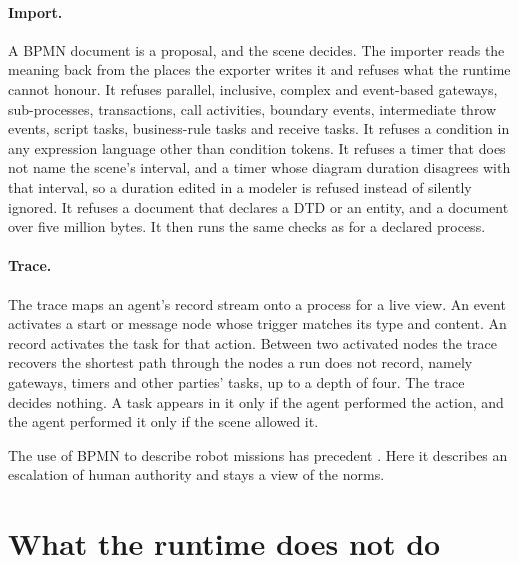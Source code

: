 \paragraph{Import.}
A BPMN document is a proposal, and the scene decides. The importer reads the meaning back from the
places the exporter writes it and refuses what the runtime cannot honour. It refuses parallel,
inclusive, complex and event-based gateways, sub-processes, transactions, call activities, boundary
events, intermediate throw events, script tasks, business-rule tasks and receive tasks. It refuses a
condition in any expression language other than condition tokens. It refuses a timer that does not
name the scene's interval, and a timer whose diagram duration disagrees with that interval, so a
duration edited in a modeler is refused instead of silently ignored. It refuses a document that
declares a DTD or an entity, and a document over five million bytes. It then runs the same checks as
for a declared process.

\paragraph{Trace.}
The trace maps an agent's record stream onto a process for a live view. An event activates a start or
message node whose trigger matches its type and content. An  record activates
the task for that action. Between two activated nodes the trace recovers the shortest path through
the nodes a run does not record, namely gateways, timers and other parties' tasks, up to a depth of
four. The trace decides nothing. A task appears in it only if the agent performed the action, and the
agent performed it only if the scene allowed it.

The use of BPMN to describe robot missions has precedent \cite{corradini2023bpmn}. Here it describes
an escalation of human authority and stays a view of the norms.

\section{What the runtime does not do}\label{sec:runtime-limits}

